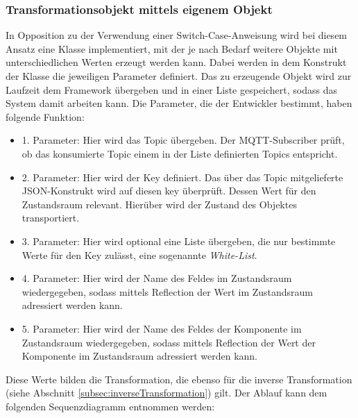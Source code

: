     \subsubsection*{Transformationsobjekt mittels eigenem Objekt}
        In Opposition zu der Verwendung einer Switch-Case-Anweisung wird bei diesem Ansatz eine Klasse implementiert, mit der je nach Bedarf 
        weitere Objekte mit unterschiedlichen Werten erzeugt werden kann. Dabei werden in dem Konstrukt der Klasse die jeweiligen Parameter 
        definiert. Das zu erzeugende Objekt wird zur Laufzeit dem Framework übergeben und in einer Liste gespeichert, sodass das System damit arbeiten kann. 
        Die Parameter, die der Entwickler bestimmt, haben folgende Funktion:
        \begin{itemize}
            \item 1. Parameter: Hier wird das Topic übergeben. Der \acs{MQTT}-Subscriber prüft, ob das konsumierte Topic einem in der Liste definierten Topics entspricht.
            \item 2. Parameter: Hier wird der Key definiert. Das über das Topic mitgelieferte JSON-Konstrukt wird auf diesen key überprüft. Dessen Wert für den Zustandsraum relevant. Hierüber wird der Zustand des Objektes transportiert.
            \item 3. Parameter: Hier wird optional eine Liste übergeben, die nur bestimmte Werte für den Key zulässt, eine sogenannte \textit{White-List}.
            \item 4. Parameter: Hier wird der Name des Feldes im Zustandsraum wiedergegeben, sodass mittels Reflection der Wert im Zustandsraum adressiert werden kann.
            \item 5. Parameter: Hier wird der Name des Feldes der Komponente im Zustandsraum wiedergegeben, sodass mittels Reflection der Wert der Komponente im Zustandsraum adressiert werden kann.
        \end{itemize}
        Diese Werte bilden die Transformation, die ebenso für die inverse Transformation (siehe Abschnitt \ref{subsec:inverseTransformation}) gilt.
        Der Ablauf kann dem folgenden Sequenzdiagramm entnommen werden:
        \\
        \pagebreak
